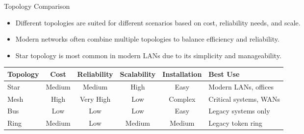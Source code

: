 \documentclass[aspectratio=169]{beamer}
\begin{document}
\begin{frame}{Topology Comparison}

\begin{itemize}
    \item Different topologies are suited for different scenarios based on cost, reliability needs, and scale.
    \item Modern networks often combine multiple topologies to balance efficiency and reliability.
    \item Star topology is most common in modern LANs due to its simplicity and manageability.
\end{itemize}

\vspace{0.2cm}

\begin{table}
\centering
\small
\begin{tabular}{|l|c|c|c|c|p{2.5cm}|}
\hline
\rowcolor{networkblue!30}
\textbf{Topology} & \textbf{Cost} & \textbf{Reliability} & \textbf{Scalability} & \textbf{Installation} & \textbf{Best Use} \\ \hline
Star & Medium & Medium & High & Easy & Modern LANs, offices \\ \hline
\rowcolor{gray!10}
Mesh & High & Very High & Low & Complex & Critical systems, WANs \\ \hline
Bus & Low & Low & Low & Easy & Legacy systems only \\ \hline
\rowcolor{gray!10}
Ring & Medium & Low & Medium & Medium & Legacy token ring \\ \hline
\end{tabular}
\end{table}

\end{frame}
\end{document}
